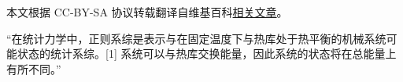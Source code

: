 
本文根据 CC-BY-SA 协议转载翻译自维基百科\href{https://en.wikipedia.org/wiki/Canonical_ensemble}{相关文章}。

“在统计力学中，正则系综是表示与在固定温度下与热库处于热平衡的机械系统可能状态的统计系综。[1] 系统可以与热库交换能量，因此系统的状态将在总能量上有所不同。”